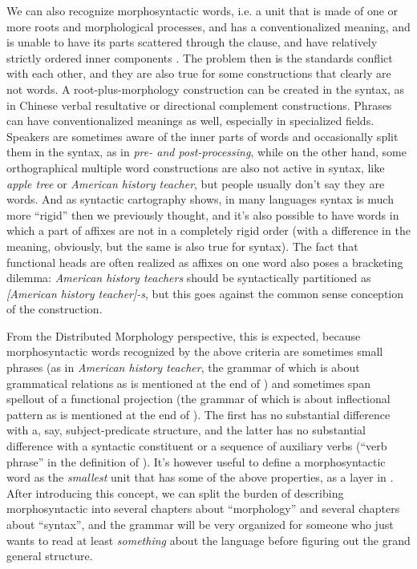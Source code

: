 \documentclass[UTF8, a4paper, oneside, scheme=plain]{ctexrep}
\newcommand*{\citesec}[1]{\S~{#1}}
\newcommand{\corpus}[1]{\emph{#1}}
\begin{document}
We can also recognize morphosyntactic words, 
i.e. a unit that is made of one or more roots and morphological processes, and
has a conventionalized meaning, and
is unable to have its parts scattered through the clause,
and have relatively strictly ordered inner components
\citep[\citesec{10.4}]{dixon2010basic2}.
The problem then is the standards conflict with each other,
and they are also true for some constructions that clearly are not words.
A root-plus-morphology construction 
can be created in the syntax,
as in Chinese verbal resultative or directional complement constructions.
Phrases can have conventionalized meanings as well,
especially in specialized fields.
Speakers are sometimes aware of the inner parts of words 
and occasionally split them in the syntax,
as in \corpus{pre- and post-processing},
while on the other hand,
some orthographical multiple word constructions 
are also not active in syntax,
like \corpus{apple tree} or \corpus{American history teacher},
but people usually don't say they are words.
And as syntactic cartography shows,
in many languages syntax is much more ``rigid'' then we previously thought,
and it's also possible to have words in which a part of affixes are not in a completely rigid order
(with a difference in the meaning, obviously, but the same is also true for syntax).
The fact that functional heads are often realized as affixes on one word
also poses a bracketing dilemma:
\corpus{American history teachers} should be syntactically partitioned as 
\corpus{[American history teacher]-s},
but this goes against the common sense conception of the construction.

From the Distributed Morphology perspective,
this is expected,
because morphosyntactic words recognized by the above criteria 
are sometimes small phrases
(as in \corpus{American history teacher}, 
the grammar of which is about grammatical relations 
as is mentioned at the end of ) 
and sometimes span spellout of a functional projection
(the grammar of which is about inflectional pattern 
as is mentioned at the end of ).
The first has no substantial difference with a, say, subject-predicate structure,
and the latter has no substantial difference with a syntactic constituent or 
a sequence of auxiliary verbs
(``verb phrase'' in the definition of \citet{dixon2009basic1}).
It's however useful to define a morphosyntactic word as the \emph{smallest} unit 
that has some of the above properties,
as a layer in .
After introducing this concept,
we can split the burden of describing morphosyntactic 
into several chapters about ``morphology''
and several chapters about ``syntax'',
and the grammar will be very organized 
for someone who just wants to read at least \emph{something} about the language 
before figuring out the grand general structure.
\end{document}
